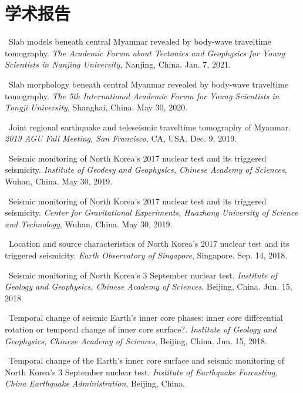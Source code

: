 \section{学术报告}
\begin{etaremune}
\item
    \Yao\
    Slab models beneath central Myanmar revealed by body-wave traveltime tomography.
    \textit{The Academic Forum about Tectonics and Geophysics for Young Scientists in Nanjing University}, Nanjing, China.
    Jan. 7, 2021.
\item
    \Yao\
    Slab morphology beneath central Myanmar revealed by body-wave traveltime tomography.
    \textit{The 5th International Academic Forum for Young Scientists in Tongji University}, Shanghai, China.
    May 30, 2020.
\item
    \Yao\
    Joint regional earthquake and teleseismic traveltime tomography of Myanmar.
    \textit{2019 AGU Fall Meeting, San Francisco}, CA, USA.
    Dec. 9, 2019.
\item
    \Yao\
    Seismic monitoring of North Korea's 2017 nuclear test and its triggered seismicity.
    \textit{Institute of Geodesy and Geophysics, Chinese Academy of Sciences}, Wuhan, China.
    May 30, 2019.
    \invited
\item
    \Yao\
    Seismic monitoring of North Korea's 2017 nuclear test and its triggered seismicity.
    \textit{Center for Gravitational Experiments, Huazhong University of Science and Technology}, Wuhan, China.
    May 30, 2019.
\item
    \Yao\
    Location and source characteristics of North Korea's 2017 nuclear test and its triggered seismicity.
    \textit{Earth Observatory of Singapore}, Singapore.
    Sep. 14, 2018.
    \invited
\item
    \Yao\
    Seismic monitoring of North Korea's 3 September nuclear test.
    \textit{Institute of Geology and Geophysics, Chinese Academy of Sciences}, Beijing, China.
    Jun. 15, 2018.
    \invited
\item
    \Yao\
    Temporal change of seismic Earth's inner core phases: inner core differential rotation or temporal change of inner core surface?.
    \textit{Institute of Geology and Geophysics, Chinese Academy of Sciences}, Beijing, China.
    Jun. 15, 2018.
    \invited
\item
    \Yao\
    Temporal change of the Earth's inner core surface and seismic monitoring of North Korea's 3 September nuclear test.
    \textit{Institute of Earthquake Forcasting, China Earthquake Administration}, Beijing, China.

\end{etaremune}
